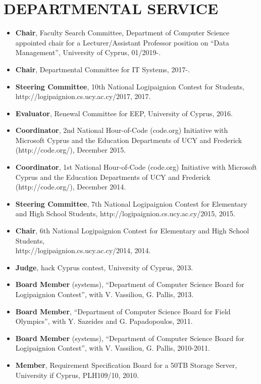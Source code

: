 \documentclass[10pt]{article}
\begin{document}
\section{\bf DEPARTMENTAL SERVICE}
\begin{itemize}
\setlength{\itemsep}{0.10ex}
   \item {\bf Chair}, Faculty Search Committee, Department of Computer Science appointed chair for a Lecturer/Assistant Professor position on ``Data Management'', University of Cyprus, 01/2019-.
   \item {\bf Chair}, Departmental Committee for IT Systems, 2017-.
   \item {\bf Steering Committee}, 10th National Logipaignion Contest for Students, http://logipaignion.cs.ucy.ac.cy/2017, 2017.
    \item {\bf Evaluator}, Renewal Committee for EEP, University of Cyprus, 2016. %
   \item {\bf Coordinator}, 2nd National Hour-of-Code (code.org) Initiative with Microsoft Cyprus and the Education Departments of UCY and Frederick (http://code.org/), December 2015.
   \item {\bf Coordinator}, 1st National Hour-of-Code (code.org) Initiative with Microsoft Cyprus and the Education Departments of UCY and Frederick (http://code.org/), December 2014.
   \item {\bf Steering Committee}, 7th National Logipaignion Contest for Elementary and High School Students, http://logipaignion.cs.ucy.ac.cy/2015, 2015.
   \item {\bf Chair}, 6th National Logipaignion Contest for Elementary and High School Students, \\
   http://logipaignion.cs.ucy.ac.cy/2014, 2014.
    \item {\bf Judge}, hack Cyprus contest, University of Cyprus, 2013.
    \item {\bf Board Member} (systems), ``Department of Computer Science Board for Logipaignion Contest'', with V. Vassiliou, G. Pallis, 2013.
   \item {\bf Board Member}, ``Department of Computer Science Board for Field Olympics'', with Y. Sazeides and G. Papadopoulos, 2011.
    \item {\bf Board Member} (systems), ``Department of Computer Science Board for Logipaignion Contest'', with V. Vassiliou, G. Pallis, 2010-2011.
   \item {\bf Member}, Requirement Specification Board for a 50TB Storage Server, University if Cyprus, PLH109/10, 2010.

\end{itemize}
\end{document}
